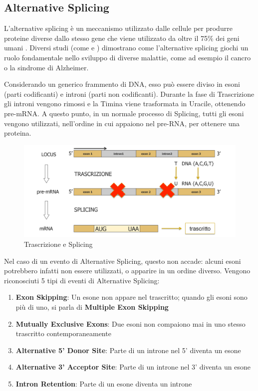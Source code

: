 \subsection{Alternative Splicing}

L'alternative splicing è un meccanismo utilizzato dalle cellule per produrre proteine diverse dallo stesso gene che viene utilizzato da oltre il 75\% dei geni umani \cite{wang2008alternative}. Diversi studi (come \cite{tazi2009alternative} e \cite{rockenstein1995levels}) dimostrano come l'alternative splicing giochi un ruolo fondamentale nello sviluppo di diverse malattie, come ad esempio il cancro o la sindrome di Alzheimer.

Considerando un generico frammento di DNA, esso può essere diviso in esoni (parti codificanti) e introni (parti non codificanti). Durante la fase di Trascrizione gli introni vengono rimossi e la Timina viene trasformata in Uracile, ottenendo pre-mRNA. A questo punto, in un normale processo di Splicing, tutti gli esoni vengono utilizzati, nell'ordine in cui appaiono nel pre-RNA, per ottenere una proteina.

\begin{figure}[h!]
	\centering
	\includegraphics[width=\linewidth]{images/splicing.png}
  \caption{Trascrizione e Splicing}
  \label{fig:Splicing}
\end{figure}

Nel caso di un evento di Alternative Splicing, questo non accade: alcuni esoni potrebbero infatti non essere utilizzati, o apparire in un ordine diverso. Vengono riconosciuti 5 tipi di eventi di Alternative Splicing:

\begin{enumerate}
	\item \textbf{Exon Skipping}: Un esone non appare nel trascritto; quando gli esoni sono più di uno, si parla di \textbf{Multiple Exon Skipping}
	\item \textbf{Mutually Exclusive Exons}: Due esoni non compaiono mai in uno stesso trascritto contemporaneamente
	\item \textbf{Alternative 5' Donor Site}: Parte di un introne nel 5' diventa un esone
	\item \textbf{Alternative 3' Acceptor Site}: Parte di un introne nel 3' diventa un esone
	\item \textbf{Intron Retention}: Parte di un esone diventa un introne
\end{enumerate}

